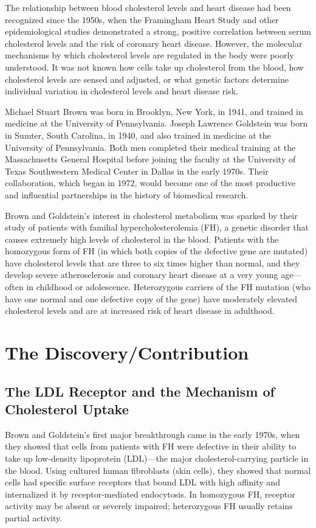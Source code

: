 The relationship between blood cholesterol levels and heart disease had been recognized since the 1950s, when the Framingham Heart Study and other epidemiological studies demonstrated a strong, positive correlation between serum cholesterol levels and the risk of coronary heart disease. However, the molecular mechanisms by which cholesterol levels are regulated in the body were poorly understood. It was not known how cells take up cholesterol from the blood, how cholesterol levels are sensed and adjusted, or what genetic factors determine individual variation in cholesterol levels and heart disease risk.

Michael Stuart Brown was born in Brooklyn, New York, in 1941, and trained in medicine at the University of Pennsylvania. Joseph Lawrence Goldstein was born in Sumter, South Carolina, in 1940, and also trained in medicine at the University of Pennsylvania. Both men completed their medical training at the Massachusetts General Hospital before joining the faculty at the University of Texas Southwestern Medical Center in Dallas in the early 1970s. Their collaboration, which began in 1972, would become one of the most productive and influential partnerships in the history of biomedical research.

Brown and Goldstein's interest in cholesterol metabolism was sparked by their study of patients with familial hypercholesterolemia (FH), a genetic disorder that causes extremely high levels of cholesterol in the blood. Patients with the homozygous form of FH (in which both copies of the defective gene are mutated) have cholesterol levels that are three to six times higher than normal, and they develop severe atherosclerosis and coronary heart disease at a very young age---often in childhood or adolescence. Heterozygous carriers of the FH mutation (who have one normal and one defective copy of the gene) have moderately elevated cholesterol levels and are at increased risk of heart disease in adulthood.

\section{The Discovery/Contribution}

\subsection{The LDL Receptor and the Mechanism of Cholesterol Uptake}

Brown and Goldstein's first major breakthrough came in the early 1970s, when they showed that cells from patients with FH were defective in their ability to take up low-density lipoprotein (LDL)---the major cholesterol-carrying particle in the blood. Using cultured human fibroblasts (skin cells), they showed that normal cells had specific surface receptors that bound LDL with high affinity and internalized it by receptor-mediated endocytosis. In homozygous FH, receptor activity may be absent or severely impaired; heterozygous FH usually retains partial activity.

